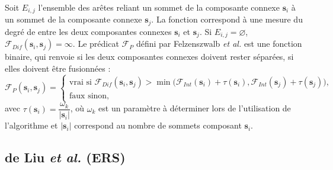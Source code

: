 Soit $E_{i,j}$ l'ensemble des arêtes reliant un sommet de la composante connexe $\mathbf{s}_{i}$ à un sommet de la composante connexe $\mathbf{s}_{j}$. La fonction 
correspond à une mesure du degré de  entre les deux composantes connexes $\mathbf{s}_{i}$ et $\mathbf{s}_{j}$. Si $E_{i,j} = \varnothing$, $\mathcal{F}_{Dif}(\mathbf{s}_{i},\mathbf{s}_{j})= \infty$. Le prédicat $\mathcal{F}_{P}$ défini par Felzenszwalb \textit{et al.} \cite{felzenszwalb2004efficient} est une fonction  binaire, qui renvoie  si les deux composantes connexes doivent rester séparées,  si elles doivent être fusionnées : 
\begin{equation}
\mathcal{F}_{P}(\mathbf{s}_{i},\mathbf{s}_{j}) = \left\{
    \begin{array}{l}
       \text{vrai si } \mathcal{F}_{Dif}(\mathbf{s}_{i},\mathbf{s}_{j}) > \min\Big(\mathcal{F}_{Int}(\mathbf{s}_{i}) + \tau(\mathbf{s}_{i}) ,\mathcal{F}_{Int}(\mathbf{s}_{j}) + \tau(\mathbf{s}_{j})\Big)\text{,}\\
        \text{faux sinon, }
    \end{array}
    \right.
\end{equation}
avec  $\tau(\mathbf{s}_{i}) = \dfrac{\omega_{k}}{|\mathbf{s}_{i}|}$, où $\omega_{k}$ est un paramètre à déterminer lors de l'utilisation de l'algorithme et $|\mathbf{s}_{i}|$ correspond au nombre de sommets composant $\mathbf{s}_{i}$.

\subsection{ de Liu \textit{et al.} (ERS)}

